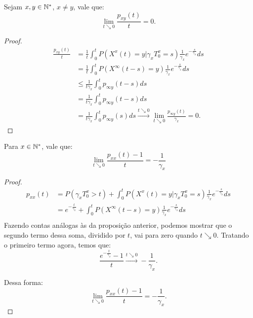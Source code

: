 \begin{proposicao}
  \label{prop:taxa-x-y}
  Sejam $x, y \in {\mathbb{N^*}}$, $x \neq y$, vale que:
  \begin{displaymath}
    \lim_{t \searrow 0} \frac{p_{xy}(t)}{t} = 0.
  \end{displaymath}
\end{proposicao}
\begin{proof}
  \begin{align*}
    \frac{p_{x y} (t)}{t}
    &= \frac{1}{t}\int_{0}^{t} P( X^x(t) = y |
    \gamma_x T_0^x = s) \frac{1}{\gamma_x} e^{-\frac{s}{\gamma_x}} ds\\
    &= \frac{1}{t} \int_{0}^{t} P( X^\infty(t-s) = y ) \frac{1}{\gamma_x}
    e^{-\frac{s}{\gamma_x}} ds \\
    &\leq \frac{1}{t \gamma_x} \int_{0}^{t} p_{\infty y}(t-s) ds \\
    &= \frac{1}{t \gamma_x} \int_{0}^{t} p_{\infty y}(t-s) ds \\
    &= \frac{1}{t \gamma_x} \int_{0}^{t} p_{\infty y}(s) ds
    \xrightarrow{t \searrow 0} \lim_{t \searrow 0} \frac{p_{\infty y}
      (t)}{\gamma_x} = 0.
  \end{align*}

\end{proof}

\begin{proposicao}
  \label{prop:taxa-x-x}
  Para $x \in {\mathbb{N^*}}$, vale que:
  \begin{displaymath}
    \lim_{t \searrow 0} \frac{p_{xx}(t) - 1}{t} = -\frac{1}{\gamma_x}
  \end{displaymath}
\end{proposicao}
\begin{proof}
  \begin{align*}
    p_{xx} (t)
    &= P( \gamma_x T_0^x > t) + 
    \int_{0}^{t} P( X^x(t) = y |
    \gamma_x T_0^x = s) \frac{1}{\gamma_x} e^{-\frac{s}{\gamma_x}} ds\\
    &= e^{-\frac{t}{\gamma_x}} + 
    \int_{0}^{t} P( X^\infty(t-s) = y) \frac{1}{\gamma_x} e^{-\frac{s}{\gamma_x}} ds\\
  \end{align*}
  Fazendo contas análogas às da proposição anterior, podemos
  mostrar que o segundo termo dessa soma, dividido por $t$, vai para
  zero quando $t \searrow 0$. Tratando o primeiro termo agora, temos
  que:
  \begin{displaymath}
    \frac{e^{-\frac{t}{\gamma_x}} - 1}{t} \xrightarrow{t \searrow 0}
    -\frac{1}{\gamma_x}.
  \end{displaymath}

  Dessa forma:
  \begin{displaymath}
     \lim_{t \searrow 0} \frac{p_{xx} (t) - 1}{t} = -\frac{1}{\gamma_x}.
  \end{displaymath}
  
\end{proof}

